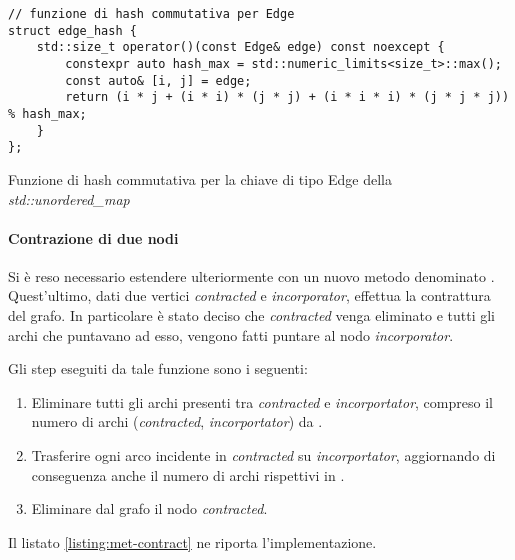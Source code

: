 \begin{listing}[!ht]
\begin{verbatim}
// funzione di hash commutativa per Edge
struct edge_hash {
    std::size_t operator()(const Edge& edge) const noexcept {
        constexpr auto hash_max = std::numeric_limits<size_t>::max();
        const auto& [i, j] = edge;
        return (i * j + (i * i) * (j * j) + (i * i * i) * (j * j * j)) % hash_max;
    }
};
\end{verbatim}
\caption{Funzione di hash commutativa per la chiave di tipo Edge della \textit{std::unordered\_map}}
\label{listing:hash-fun}
\end{listing}

\paragraph{Contrazione di due nodi}
Si è reso necessario estendere ulteriormente
 con un nuovo metodo denominato
. Quest'ultimo, dati due vertici
\textit{contracted} e \textit{incorporator}, effettua la contrattura
del grafo. In particolare è stato deciso che \textit{contracted} venga
eliminato e tutti gli archi che puntavano ad esso, vengono fatti
puntare al nodo \textit{incorporator}.

\noindent Gli step eseguiti da tale funzione sono i seguenti:
\begin{enumerate}
    \item Eliminare tutti gli archi presenti tra
      \textit{contracted} e \textit{incorportator}, compreso il numero
      di archi (\textit{contracted}, \textit{incorportator}) da
      .
    
    \item Trasferire ogni arco incidente in
      \textit{contracted} su \textit{incorportator}, aggiornando di
      conseguenza anche il numero di archi rispettivi in
      .
    
    \item Eliminare dal grafo il nodo
       \textit{contracted}.
\end{enumerate}
Il listato \ref{listing:met-contract} ne riporta l'implementazione.

